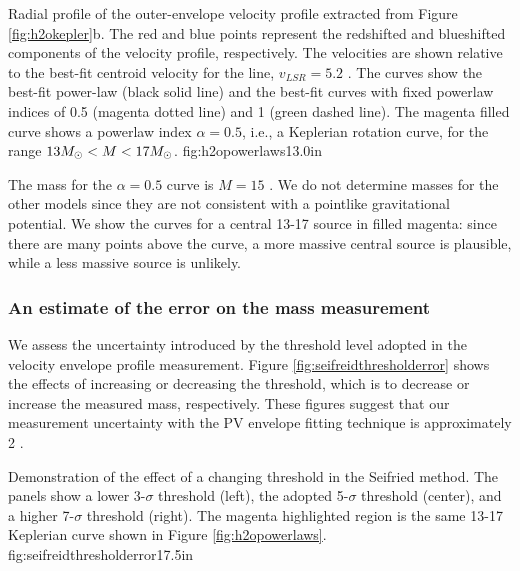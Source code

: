 \documentclass[twocolumn]{aastex62}
\begin{document}

{Radial profile of the outer-envelope velocity profile extracted from
Figure \ref{fig:h2okepler}b.  The red and blue points represent the redshifted
and blueshifted components of the velocity profile, respectively.  The velocities
are shown relative to the best-fit centroid velocity for the \water line,
$v_{LSR}=5.2$ \kms.  The curves show the best-fit power-law (black solid line)
and the best-fit curves with fixed powerlaw indices of 0.5 (magenta dotted line)
and 1 (green dashed line).  The magenta filled curve shows a powerlaw index
$\alpha=0.5$, i.e., a Keplerian rotation curve, for the range $13 M_{\odot} < M <
17 M_{\odot}$. }
{fig:h2opowerlaws}{1}{3.0in}



The mass for the $\alpha=0.5$ curve is $M=15$ \msun.  We do not determine
masses for the other models since they are not consistent with a pointlike
gravitational potential.  We show the curves for a central 13-17 \msun source
in filled magenta: since there are many points above the curve, a more massive
central source is plausible, while a less massive source is unlikely.

\subsubsection{An estimate of the error on the mass measurement}
\label{sec:errorestimate}
We  assess the uncertainty introduced by the threshold level adopted in the
velocity envelope profile measurement.  Figure \ref{fig:seifreidthresholderror}
shows the effects of increasing or decreasing the threshold, which is to
decrease or increase the measured mass, respectively.  These figures suggest
that our measurement uncertainty with the PV envelope fitting technique  is
approximately 2 \msun.

{Demonstration of the effect of a changing threshold in the Seifried method.
The panels show a lower 3-$\sigma$ threshold (left), the adopted 5-$\sigma$
threshold (center), and a higher 7-$\sigma$ threshold (right).  
The magenta highlighted region is the same 13-17 \msun Keplerian curve shown
in Figure \ref{fig:h2opowerlaws}.  
}
{fig:seifreidthresholderror}{1}{7.5in}
\end{document}
